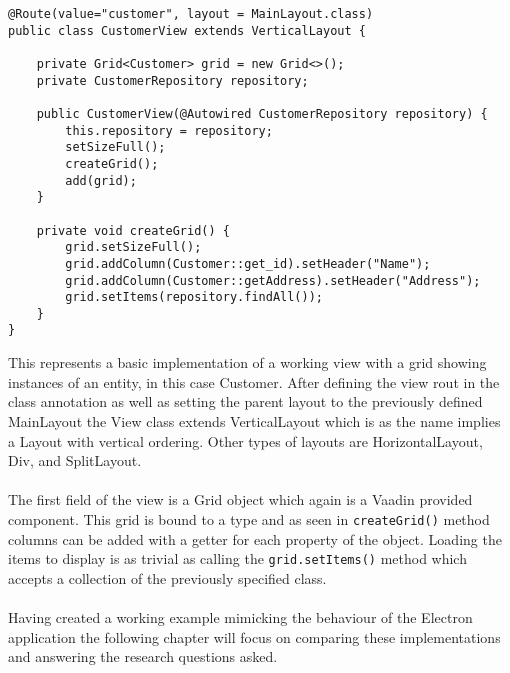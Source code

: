 \begin{lstlisting}[caption=Creating a Vaadin view]
@Route(value="customer", layout = MainLayout.class)
public class CustomerView extends VerticalLayout {
    
    private Grid<Customer> grid = new Grid<>();
    private CustomerRepository repository;
    
    public CustomerView(@Autowired CustomerRepository repository) {
        this.repository = repository;
        setSizeFull();
        createGrid();            
        add(grid);
    }
    
    private void createGrid() {
        grid.setSizeFull();
        grid.addColumn(Customer::get_id).setHeader("Name");
        grid.addColumn(Customer::getAddress).setHeader("Address");
        grid.setItems(repository.findAll());
    }
}
\end{lstlisting}
This represents a basic implementation of a working view with a grid showing instances of an entity, in this case Customer.
After defining the view rout in the class annotation as well as setting the parent layout to the previously defined 
MainLayout the View class extends VerticalLayout which is as the name implies a Layout with vertical ordering. 
Other types of layouts are HorizontalLayout, Div, and SplitLayout. \parencite{vaadinDocs}\paragraph{}
The first field of the view is a Grid object which again is a Vaadin provided component. 
This grid is bound to a type and as seen in \lstinline[columns=fixed]{createGrid()} method columns can be added with
a getter for each property of the object. 
Loading the items to display is as trivial as calling the \lstinline[columns=fixed]{grid.setItems()} method which
accepts a collection of the previously specified class.\paragraph{}
Having created a working example mimicking the behaviour of the Electron application the following chapter will 
focus on comparing these implementations and answering the research questions asked.